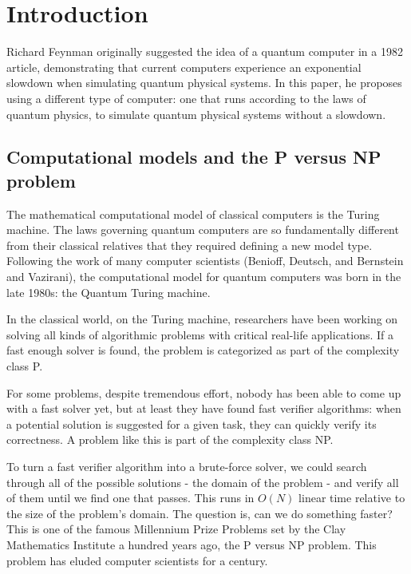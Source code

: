 \chapter{Introduction}

Richard Feynman originally suggested the idea of a quantum computer in a 1982 article\cite{feynman_simulating_1982}, demonstrating that current computers experience an exponential slowdown when simulating quantum physical systems. In this paper, he proposes using a different type of computer: one that runs according to the laws of quantum physics, to simulate quantum physical systems without a slowdown.\cite{Hirvensalo}

\section{Computational models and the P versus NP problem}

The mathematical computational model of classical computers is the Turing machine. The laws governing quantum computers are so fundamentally different from their classical relatives that they required defining a new model type. Following the work of many computer scientists (Benioff\cite{benioff_models_1998}, Deutsch\cite{deutsch_quantum_1985}, and Bernstein and Vazirani\cite{bernstein_quantum_1993}), the computational model for quantum computers was born in the late 1980s: the Quantum Turing machine.

In the classical world, on the Turing machine, researchers have been working on solving all kinds of algorithmic problems with critical real-life applications. If a fast enough solver is found, the problem is categorized as part of the complexity class P.

For some problems, despite tremendous effort, nobody has been able to come up with a fast solver yet, but at least they have found fast verifier algorithms: when a potential solution is suggested for a given task, they can quickly verify its correctness. A problem like this is part of the complexity class NP.

To turn a fast verifier algorithm into a brute-force solver, we could search through all of the possible solutions - the domain of the problem - and verify all of them until we find one that passes. This runs in $O(N)$ linear time relative to the size of the problem's domain. The question is, can we do something faster? This is one of the famous Millennium Prize Problems set by the Clay Mathematics Institute a hundred years ago, the P versus NP problem. This problem has eluded computer scientists for a century.

